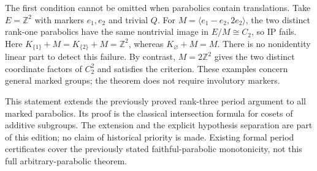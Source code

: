 The first condition cannot be omitted when parabolics contain translations.
Take $E=\mathbb Z^2$ with markers $e_1,e_2$ and trivial $Q$. For
$M=\langle e_1-e_2,2e_2\rangle$, the two distinct rank-one parabolics have
the same nontrivial image in $E/M\cong C_2$, so IP fails. Here
$K_{\{1\}}+M=K_{\{2\}}+M=\mathbb Z^2$, whereas $K_\varnothing+M=M$.
There is no nonidentity linear part to detect this failure. By contrast,
$M=2\mathbb Z^2$ gives the two distinct coordinate factors of $C_2^2$ and
satisfies the criterion. These examples concern general marked groups;
the theorem does not require involutory markers.

This statement extends the previously proved rank-three period argument to
all marked parabolics. Its proof is the classical intersection formula for
cosets of additive subgroups. The extension and the explicit hypothesis
separation are part of this edition; no claim of historical priority is
made. Existing formal period certificates cover the previously stated
faithful-parabolic monotonicity, not this full arbitrary-parabolic theorem.
